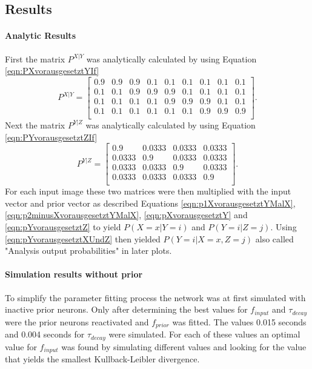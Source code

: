 \subsection{Results}

\paragraph{Analytic Results}
First the matrix $P^{X|Y}$ was analytically calculated by using Equation \ref{eqn:PXvorausgesetztYIf} 
\begin{equation}
\label{eqn:pXvorausgesetztYResult}
P^{X|Y} = \begin{bmatrix}
0.9 & 0.9 & 0.9 & 0.1 & 0.1 & 0.1 & 0.1 & 0.1 & 0.1\\
0.1 & 0.1 & 0.9 & 0.9 & 0.9 & 0.1 & 0.1 & 0.1 & 0.1\\
0.1 & 0.1 & 0.1 & 0.1 & 0.9 & 0.9 & 0.9 & 0.1 & 0.1\\
0.1 & 0.1 & 0.1 & 0.1 & 0.1 & 0.1 & 0.9 & 0.9 & 0.9\\
\end{bmatrix}.
\end{equation}
Next the matrix $P^{Y|Z}$ was analytically calculated by using Equation \ref{eqn:PYvorausgesetztZIf} 
\begin{equation}
\label{eqn:pYvorausgesetztZResult}
P^{Y|Z} = \begin{bmatrix}
0.9 & 0.0333 & 0.0333 & 0.0333\\
0.0333 & 0.9 & 0.0333 & 0.0333\\
0.0333 & 0.0333 & 0.9 & 0.0333\\
0.0333 & 0.0333 & 0.0333 & 0.9\\
\end{bmatrix}.
\end{equation} 
For each input image these two matrices were then  multiplied with the input vector and prior vector as described Equations \ref{eqn:p1XvorausgesetztYMalX}, \ref{eqn:p2minusXvorausgesetztYMalX},  \ref{eqn:pXvorausgesetztY} and \ref{eqn:pYvorausgesetztZ} to yield $P(X = x|Y = i)$ and $P(Y=i|Z=j)$. Using  \ref{eqn:pYvorausgesetztXUndZ} then 
yielded $P(Y = i|X = x, Z = j)$ also called "Analysis output probabilities" in later plots.

\paragraph{Simulation results without prior}
To simplify the parameter fitting process the network was at first simulated with inactive prior neurons. Only after determining the best values for $f_{input}$ and $\tau_{decay}$ were the prior neurons reactivated and $f_{prior}$ was fitted. The values 0.015 seconds and 0.004 seconds for $\tau_{decay}$ were simulated. For each of these values an optimal value for $f_{input}$ was found by simulating different values and looking for the value that yields the smallest Kullback-Leibler divergence.

